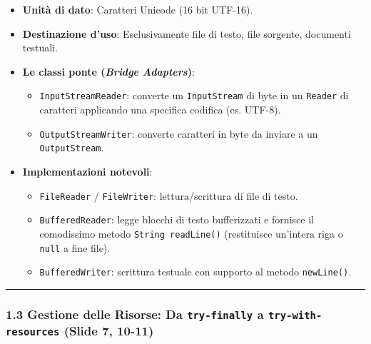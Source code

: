 \documentclass[11pt,a4paper]{article}
\newcommand{\passthrough}[1]{#1}
\providecommand{\tightlist}{\setlength{\itemsep}{0pt}\setlength{\parskip}{0pt}}
\begin{document}
\begin{itemize}
\tightlist
\item
  \textbf{Unità di dato}: Caratteri Unicode (16 bit UTF-16).
\item
  \textbf{Destinazione d'uso}: Esclusivamente file di testo, file
  sorgente, documenti testuali.
\item
  \textbf{Le classi ponte (\emph{Bridge Adapters})}:

  \begin{itemize}
  \tightlist
  \item
    \passthrough{\lstinline!InputStreamReader!}: converte un
    \passthrough{\lstinline!InputStream!} di byte in un
    \passthrough{\lstinline!Reader!} di caratteri applicando una
    specifica codifica (es. UTF-8).
  \item
    \passthrough{\lstinline!OutputStreamWriter!}: converte caratteri in
    byte da inviare a un \passthrough{\lstinline!OutputStream!}.
  \end{itemize}
\item
  \textbf{Implementazioni notevoli}:

  \begin{itemize}
  \tightlist
  \item
    \passthrough{\lstinline!FileReader!} /
    \passthrough{\lstinline!FileWriter!}: lettura/scrittura di file di
    testo.
  \item
    \passthrough{\lstinline!BufferedReader!}: legge blocchi di testo
    bufferizzati e fornisce il comodissimo metodo
    \passthrough{\lstinline!String readLine()!} (restituisce un'intera
    riga o \passthrough{\lstinline!null!} a fine file).
  \item
    \passthrough{\lstinline!BufferedWriter!}: scrittura testuale con
    supporto al metodo \passthrough{\lstinline!newLine()!}.
  \end{itemize}
\end{itemize}

\begin{center}\rule{0.5\linewidth}{0.5pt}\end{center}

\subsubsection{\texorpdfstring{1.3 Gestione delle Risorse: Da
\texttt{try-finally} a \texttt{try-with-resources} (Slide 7,
10-11)}{1.3 Gestione delle Risorse: Da try-finally a try-with-resources (Slide 7, 10-11)}}\label{gestione-delle-risorse-da-try-finally-a-try-with-resources-slide-7-10-11}
\end{document}
